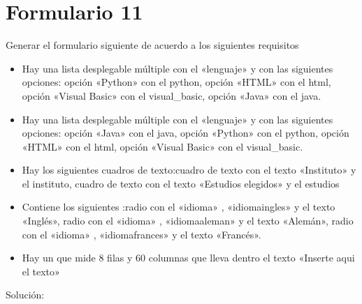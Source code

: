 \documentclass[letterpaper,10pt,spanish]{sphinxmanual}
\begin{document}
\section{Formulario 11}
\label{\detokenize{ejercicios/formularios/anexo_formularios:formulario-11}}
Generar el formulario siguiente de acuerdo a los siguientes requisitos
\begin{itemize}
\item {} 
Hay una lista desplegable múltiple con el  «lenguaje» y con las siguientes opciones: opción «Python» con el  python, opción «HTML» con el  html, opción «Visual Basic» con el  visual\_basic, opción «Java» con el  java.

\item {} 
Hay una lista desplegable múltiple con el  «lenguaje» y con las siguientes opciones: opción «Java» con el  java, opción «Python» con el  python, opción «HTML» con el  html, opción «Visual Basic» con el  visual\_basic.

\item {} 
Hay los siguientes cuadros de texto:cuadro de texto con el texto «Instituto» y el  instituto, cuadro de texto con el texto «Estudios elegidos» y el  estudios

\item {} 
Contiene los siguientes :radio con el   «idioma» ,   «idiomaingles»  y el texto «Inglés», radio con el   «idioma» ,   «idiomaaleman»  y el texto «Alemán», radio con el   «idioma» ,   «idiomafrances»  y el texto «Francés».

\item {} 
Hay un  que mide 8 filas y 60 columnas que lleva dentro el texto «Inserte aqui el texto»

\end{itemize}


Solución:
\end{document}
